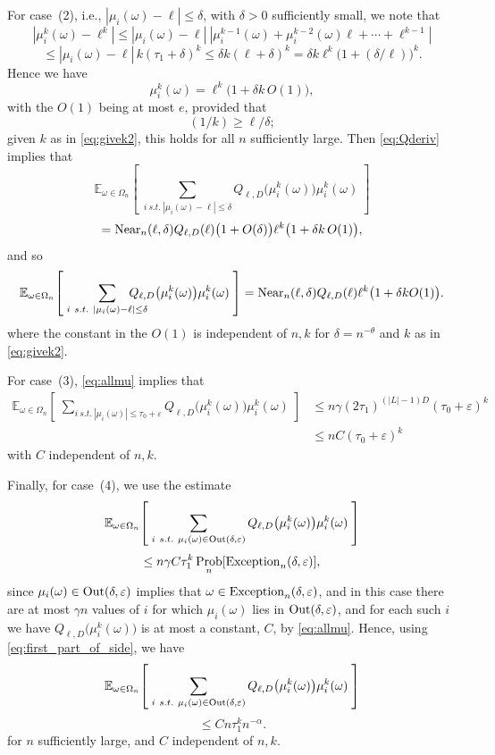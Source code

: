 \documentclass{memo-l}
\theoremstyle{plain}
\theoremstyle{definition}
\numberwithin{section}{chapter}
\numberwithin{equation}{chapter}
\newcommand{\expect}[2]{{\mathbb{E}}_{#1}{\left[\; #2\; \right]}}
\DeclareMathOperator{\Prob}{Prob}
\theoremstyle{plain}
\theoremstyle{definition}
\begin{document}
For case~(2), i.e., $|\mu_i(\omega)-\ell|\le\delta$, with $\delta>0$
sufficiently small, we note that \[ |\mu_i^k(\omega)-\ell^k | \leq
|\mu_i(\omega)-\ell| \ |\mu_i^{k-1}(\omega) + \mu_i^{k-2}(\omega)\ell +
\cdots + \ell^{k-1}| \] \[ \leq |\mu_i(\omega)-\ell| \,k (\tau_1+\delta)^k
\leq \delta k (\ell+\delta)^k = \delta k \ell^k
\bigl(1+(\delta/\ell)\bigr)^k.  \] Hence we have \[ \mu_i^k(\omega)= \ell^k
\bigr( 1 + \delta k\, O(1) \bigl), \] with the $O(1)$ being at most $e$,
provided that \[ (1/k) \geq \ell/\delta; \] given $k$ as in
\eqref{eq:givek2}, this holds for all $n$ sufficiently large.  Then
\eqref{eq:Qderiv} implies that \[ \expect{\omega\in\Omega_n}{ \sum_{i\
s.t.\ |\mu_i(\omega)-\ell|\leq \delta}
Q_{\ell,D}\bigl(\mu_i^k(\omega)\bigr) \mu_i^k(\omega) } \] \[ = {\rm
Near}_n(\ell,\delta) Q_{\ell,D}(\ell) \bigl(1+O(\delta)\bigr) \ell^k\bigr(
1 + \delta k\, O(1) \bigl), \] and so
\begin{equation}\label{eq:k_power_error2} \expect{\omega\in\Omega_n}{
\sum_{i\ s.t.\ |\mu_i(\omega)-\ell|\leq \delta} \!\!\!\!\!\!\!\!\!\!
Q_{\ell,D}\bigl(\mu_i^k(\omega)\bigr) \mu_i^k(\omega) } = {\rm
Near}_n(\ell,\delta) Q_{\ell,D}(\ell) \ell^k \bigr( 1 + \delta k O(1)
\bigl).  \end{equation} where the constant in the $O(1)$ is independent of
$n,k$ for $\delta=n^{-\theta}$ and $k$ as in \eqref{eq:givek2}.

For case~(3), \eqref{eq:allmu} implies that
\begin{align}\label{eq:k_power_error3} \expect{\omega\in\Omega_n}{\sum_{i\
s.t.\ |\mu_i(\omega)|\leq \tau_0+\varepsilon}
Q_{\ell,D}\bigl(\mu_i^k(\omega)\bigr) \mu_i^k(\omega) } & \le n\gamma
(2\tau_1)^{(|L|-1)D} (\tau_0+\varepsilon)^k \\ & \le n C
(\tau_0+\varepsilon)^k \end{align} with $C$ independent of $n,k$.

Finally, for case~(4), we use the estimate \[ \expect{\omega\in\Omega_n}{
\sum_{i\ s.t.\ \mu_i(\omega)\in{\rm Out}(\delta,\varepsilon)}
Q_{\ell,D}\bigl(\mu_i^k(\omega)\bigr) \mu_i^k(\omega) } \] \[ \leq n\gamma
C\tau_1^k \Prob_n[{\rm Exception}_n(\delta,\varepsilon)], \] since
$\mu_i(\omega)\in{\rm Out}(\delta,\varepsilon)$ implies that $\omega\in{\rm
Exception}_n(\delta,\varepsilon)$, and in this case there are at most
$\gamma n$ values of $i$ for which $\mu_i(\omega)$ lies in ${\rm
Out}(\delta,\varepsilon)$, and for each such $i$ we have
$Q_{\ell,D}\bigl(\mu_i^k(\omega)\bigr)$ is at most a constant, $C$, by
\eqref{eq:allmu}.  Hence, using \eqref{eq:first_part_of_side}, we have
\begin{equation}\label{eq:k_power_error4} \expect{\omega\in\Omega_n}{
\sum_{i\ s.t.\ \mu_i(\omega)\in{\rm Out}(\delta,\varepsilon)}
Q_{\ell,D}\bigl(\mu_i^k(\omega)\bigr) \mu_i^k(\omega) } \end{equation} \[
\leq Cn\tau_1^k n^{-\alpha}.  \] for $n$ sufficiently large, and $C$
independent of $n,k$.
\end{document}
